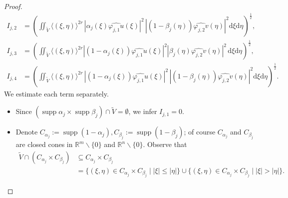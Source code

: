 \documentclass{amsart}
\newcommand{\supp}{\operatorname{supp}}
\theoremstyle{definition}
\begin{document}
\begin{proof}
\begin{align*}
I_{j,2}
&= \left( \iint_{\widetilde{V}} \langle (\xi , \eta) \rangle^{2r} \, |\alpha_j (\xi) \widehat{\varphi_{j,1} u} (\xi) |^2 \, |(1-\beta_j (\eta)) \widehat{\varphi_{j,2} v} (\eta)|^2 \mathrm{d}\xi \mathrm{d}\eta \right)^{\frac{1}{2}} ,\\
I_{j,3}
&= \left( \iint_{\widetilde{V}} \langle (\xi , \eta) \rangle^{2r} |(1-\alpha_j (\xi)) \widehat{\varphi_{j,1} u} (\xi) |^2 |\beta_j (\eta) \widehat{\varphi_{j,2} v} (\eta)|^2 \, \mathrm{d}\xi \mathrm{d}\eta \right)^{\frac{1}{2}} ,\\
I_{j,4}
&= \left( \iint_{\widetilde{V}} \langle (\xi , \eta) \rangle^{2r} \, |(1-\alpha_j (\xi)) \widehat{\varphi_{j,1} u} (\xi) |^2 \, |(1-\beta_j (\eta)) \widehat{\varphi_{j,2} v} (\eta)|^2 \mathrm{d}\xi \mathrm{d}\eta \right)^{\frac{1}{2}} .
\end{align*}
We estimate each term separately.
\begin{itemize}
\item[$\bullet$ \underline{$I_{j,1}$:}]
Since $(\supp \alpha_j \times \supp \beta_j) \cap \widetilde{V} = \emptyset$, we infer $I_{j,1} = 0$.
\item[$\bullet$ \underline{$I_{j,4}$:}]
Denote $C_{\alpha_j}:= \supp (1-\alpha_j) , C_{\beta_j}:= \supp (1-\beta_j)$; of course $C_{\alpha_j}$ and $C_{\beta_j}$ are closed cones in $\mathbb{R}^m\backslash\{0\}$ and $\mathbb{R}^n\backslash\{0\}$. Observe that
\begin{align*}
\widetilde{V}  \cap (C_{\alpha_j} \times C_{\beta_j})
& \subseteq C_{\alpha_j} \times C_{\beta_j} \\
&= \{ (\xi , \eta) \in C_{\alpha_j} \times C_{\beta_j} \mid |\xi| \leq |\eta| \} \cup \{ (\xi , \eta) \in C_{\alpha_j} \times C_{\beta_j} \mid |\xi| > |\eta| \}.
\end{align*}



\end{itemize}
\end{proof}
\end{document}

